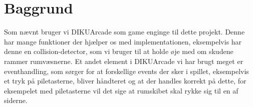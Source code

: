 \section{Baggrund}
Som nævnt bruger vi DIKUArcade som game enginge til dette projekt. Denne har mange funktioner der hjælper os med implementationen, eksempelvis har denne en collision-detector, som vi bruger til at holde øje med om skudene rammer rumvæsnerne. Et andet element i DIKUArcade vi har brugt meget er eventhandling, som sørger for at forskellige events der sker i spillet, eksempelvis et tryk på piletasterne, bliver håndteret og at der handles korrekt på dette, for eksempelet med piletasterne vil det sige at rumskibet skal rykke sig til en af siderne. 
